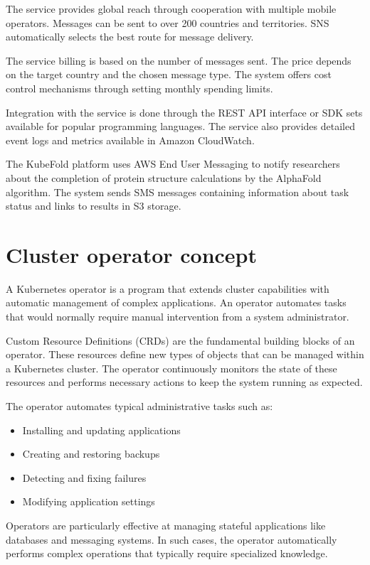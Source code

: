 The service provides global reach through cooperation with multiple mobile operators.
Messages can be sent to over 200 countries and territories.
SNS automatically selects the best route for message delivery.

The service billing is based on the number of messages sent.
The price depends on the target country and the chosen message type.
The system offers cost control mechanisms through setting monthly spending limits.

Integration with the service is done through the REST API interface or SDK sets available for popular programming languages.
The service also provides detailed event logs and metrics available in Amazon CloudWatch.

The KubeFold platform uses AWS End User Messaging to notify researchers about the completion of protein structure calculations by the AlphaFold algorithm.
The system sends SMS messages containing information about task status and links to results in S3 storage.

\section{Cluster operator concept}

A Kubernetes operator is a program that extends cluster capabilities with automatic management of complex applications.
An operator automates tasks that would normally require manual intervention from a system administrator.

Custom Resource Definitions (CRDs) are the fundamental building blocks of an operator.
These resources define new types of objects that can be managed within a Kubernetes cluster.
The operator continuously monitors the state of these resources and performs necessary actions to keep the system running as expected.

The operator automates typical administrative tasks such as:
\begin{itemize}
    \item Installing and updating applications
    \item Creating and restoring backups
    \item Detecting and fixing failures
    \item Modifying application settings
\end{itemize}

Operators are particularly effective at managing stateful applications like databases and messaging systems.
In such cases, the operator automatically performs complex operations that typically require specialized knowledge.


